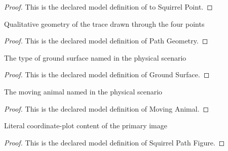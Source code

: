 \begin{proof}
  This is the declared model definition of to Squirrel Point.
\end{proof}
\begin{definition}
  \label{def:physics:phyx-mini-0737:phyxminiproblems-problemphyxmini0737-pathgeometry}
  Qualitative geometry of the trace drawn through the four points
\end{definition}
\begin{proof}
  This is the declared model definition of Path Geometry.
\end{proof}
\begin{definition}
  \label{def:physics:phyx-mini-0737:phyxminiproblems-problemphyxmini0737-groundsurface}
  The type of ground surface named in the physical scenario
\end{definition}
\begin{proof}
  This is the declared model definition of Ground Surface.
\end{proof}
\begin{definition}
  \label{def:physics:phyx-mini-0737:phyxminiproblems-problemphyxmini0737-movinganimal}
  The moving animal named in the physical scenario
\end{definition}
\begin{proof}
  This is the declared model definition of Moving Animal.
\end{proof}
\begin{definition}
  \label{def:physics:phyx-mini-0737:phyxminiproblems-problemphyxmini0737-squirrelpathfigure}
  Literal coordinate-plot content of the primary image
\end{definition}
\begin{proof}
  This is the declared model definition of Squirrel Path Figure.
\end{proof}
